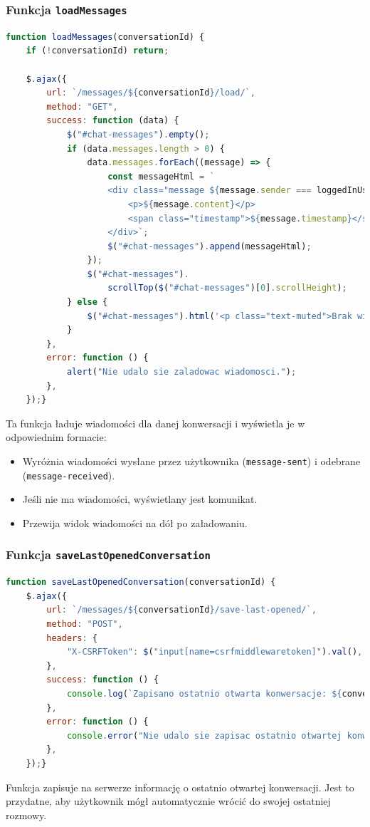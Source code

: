 \documentclass[12pt,a4paper,oneside]{article}
\theoremstyle{definition}
\numberwithin{equation}{section}
\begin{document}
\subsubsection*{Funkcja \texttt{loadMessages}}
\begin{lstlisting}[language=JavaScript, caption=Funkcja \texttt{loadMessages}]
function loadMessages(conversationId) {
    if (!conversationId) return;

    $.ajax({
        url: `/messages/${conversationId}/load/`,
        method: "GET",
        success: function (data) {
            $("#chat-messages").empty();
            if (data.messages.length > 0) {
                data.messages.forEach((message) => {
                    const messageHtml = `
                    <div class="message ${message.sender === loggedInUser ? "message-sent" : "message-received"}">
                        <p>${message.content}</p>
                        <span class="timestamp">${message.timestamp}</span>
                    </div>`;
                    $("#chat-messages").append(messageHtml);
                });
                $("#chat-messages").
                    scrollTop($("#chat-messages")[0].scrollHeight);
            } else {
                $("#chat-messages").html('<p class="text-muted">Brak wiadomosci w tej konwersacji.</p>');
            }
        },
        error: function () {
            alert("Nie udalo sie zaladowac wiadomosci.");
        },
    });}
\end{lstlisting}
Ta funkcja ładuje wiadomości dla danej konwersacji i wyświetla je w odpowiednim formacie:
\begin{itemize}
    \item Wyróżnia wiadomości wysłane przez użytkownika (\texttt{message-sent})
        \subsubitem i odebrane (\texttt{message-received}).
    \item Jeśli nie ma wiadomości, wyświetlany jest komunikat.
    \item Przewija widok wiadomości na dół po załadowaniu.
\end{itemize}



\subsubsection*{Funkcja \texttt{saveLastOpenedConversation}}
\begin{lstlisting}[language=JavaScript, caption=Funkcja \texttt{saveLastOpenedConversation}]
function saveLastOpenedConversation(conversationId) {
    $.ajax({
        url: `/messages/${conversationId}/save-last-opened/`,
        method: "POST",
        headers: {
            "X-CSRFToken": $("input[name=csrfmiddlewaretoken]").val(),
        },
        success: function () {
            console.log(`Zapisano ostatnio otwarta konwersacje: ${conversationId}`);
        },
        error: function () {
            console.error("Nie udalo sie zapisac ostatnio otwartej konwersacji.");
        },
    });}
\end{lstlisting}
Funkcja zapisuje na serwerze informację o ostatnio otwartej konwersacji. Jest to przydatne, aby użytkownik mógł automatycznie wrócić do swojej ostatniej rozmowy.
\end{document}
